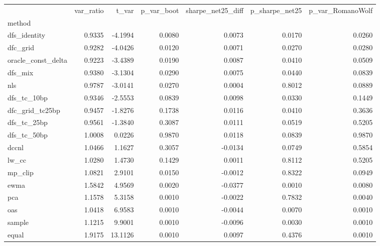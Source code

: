 \begin{tabular}{lrrrrrr}
\toprule
 & var_ratio & t_var & p_var_boot & sharpe_net25_diff & p_sharpe_net25 & p_var_RomanoWolf \\
method &  &  &  &  &  &  \\
\midrule
dfs_identity & 0.9335 & -4.1994 & 0.0080 & 0.0073 & 0.0170 & 0.0260 \\
dfc_grid & 0.9282 & -4.0426 & 0.0120 & 0.0071 & 0.0270 & 0.0280 \\
oracle_const_delta & 0.9223 & -3.4389 & 0.0190 & 0.0087 & 0.0410 & 0.0509 \\
dfs_mix & 0.9380 & -3.1304 & 0.0290 & 0.0075 & 0.0440 & 0.0839 \\
nls & 0.9787 & -3.0141 & 0.0270 & 0.0004 & 0.8012 & 0.0889 \\
dfs_tc_10bp & 0.9346 & -2.5553 & 0.0839 & 0.0098 & 0.0330 & 0.1449 \\
dfc_grid_tc25bp & 0.9457 & -1.8276 & 0.1738 & 0.0116 & 0.0410 & 0.3636 \\
dfs_tc_25bp & 0.9561 & -1.3840 & 0.3087 & 0.0111 & 0.0519 & 0.5205 \\
dfs_tc_50bp & 1.0008 & 0.0226 & 0.9870 & 0.0118 & 0.0839 & 0.9870 \\
dccnl & 1.0466 & 1.1627 & 0.3057 & -0.0134 & 0.0749 & 0.5854 \\
lw_cc & 1.0280 & 1.4730 & 0.1429 & 0.0011 & 0.8112 & 0.5205 \\
mp_clip & 1.0821 & 2.9101 & 0.0150 & -0.0012 & 0.8322 & 0.0949 \\
ewma & 1.5842 & 4.9569 & 0.0020 & -0.0377 & 0.0010 & 0.0080 \\
pca & 1.1578 & 5.3158 & 0.0010 & -0.0022 & 0.7832 & 0.0040 \\
oas & 1.0418 & 6.9583 & 0.0010 & -0.0044 & 0.0070 & 0.0010 \\
sample & 1.1215 & 9.9001 & 0.0010 & -0.0096 & 0.0030 & 0.0010 \\
equal & 1.9175 & 13.1126 & 0.0010 & 0.0097 & 0.4376 & 0.0010 \\
\bottomrule
\end{tabular}
